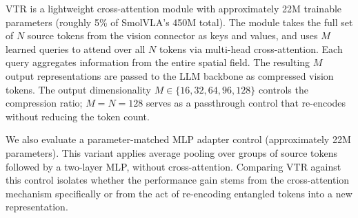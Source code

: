 VTR is a lightweight cross-attention module with approximately 22M trainable parameters (roughly 5\% of SmolVLA's 450M total). The module takes the full set of $N$ source tokens from the vision connector as keys and values, and uses $M$ learned queries to attend over all $N$ tokens via multi-head cross-attention. Each query aggregates information from the entire spatial field. The resulting $M$ output representations are passed to the LLM backbone as compressed vision tokens. The output dimensionality $M \in \{16, 32, 64, 96, 128\}$ controls the compression ratio; $M = N = 128$ serves as a passthrough control that re-encodes without reducing the token count.

We also evaluate a parameter-matched MLP adapter control (approximately 22M parameters). This variant applies average pooling over groups of source tokens followed by a two-layer MLP, without cross-attention. Comparing VTR against this control isolates whether the performance gain stems from the cross-attention mechanism specifically or from the act of re-encoding entangled tokens into a new representation.
